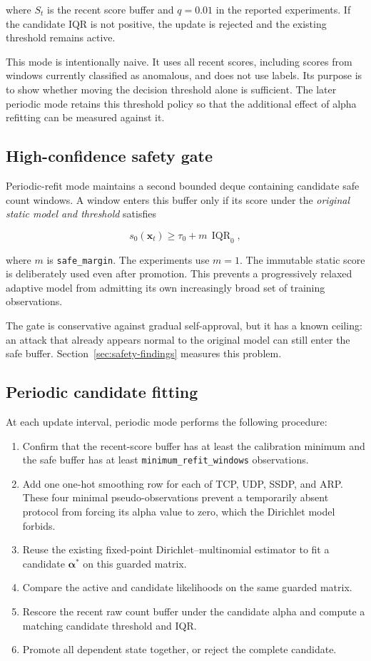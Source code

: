 \documentclass[11pt,a4paper]{article}
\begin{document}
where $S_t$ is the recent score buffer and $q=0.01$ in the reported
experiments. If the candidate IQR is not positive, the update is rejected and
the existing threshold remains active.

This mode is intentionally naive. It uses all recent scores, including scores
from windows currently classified as anomalous, and does not use labels. Its
purpose is to show whether moving the decision threshold alone is sufficient.
The later periodic mode retains this threshold policy so that the additional
effect of alpha refitting can be measured against it.

\subsection{High-confidence safety gate}

Periodic-refit mode maintains a second bounded deque containing candidate safe
count windows. A window enters this buffer only if its score under the
\emph{original static model and threshold} satisfies

\[
s_0(\mathbf{x}_t)
\geq
\tau_0 + m\,\operatorname{IQR}_0,
\]

where $m$ is \texttt{safe\_margin}. The experiments use $m=1$. The immutable
static score is deliberately used even after promotion. This prevents a
progressively relaxed adaptive model from admitting its own increasingly broad
set of training observations.

The gate is conservative against gradual self-approval, but it has a known
ceiling: an attack that already appears normal to the original model can still
enter the safe buffer. Section~\ref{sec:safety-findings} measures this problem.

\subsection{Periodic candidate fitting}

At each update interval, periodic mode performs the following procedure:

\begin{enumerate}
  \item Confirm that the recent-score buffer has at least the calibration
  minimum and the safe buffer has at least
  \texttt{minimum\_refit\_windows} observations.
  \item Add one one-hot smoothing row for each of TCP, UDP, SSDP, and ARP.
  These four minimal pseudo-observations prevent a temporarily absent protocol
  from forcing its alpha value to zero, which the Dirichlet model forbids.
  \item Reuse the existing fixed-point Dirichlet--multinomial estimator to fit
  a candidate $\boldsymbol{\alpha}^{*}$ on this guarded matrix.
  \item Compare the active and candidate likelihoods on the same guarded
  matrix.
  \item Rescore the recent raw count buffer under the candidate alpha and
  compute a matching candidate threshold and IQR.
  \item Promote all dependent state together, or reject the complete candidate.
\end{enumerate}
\end{document}
